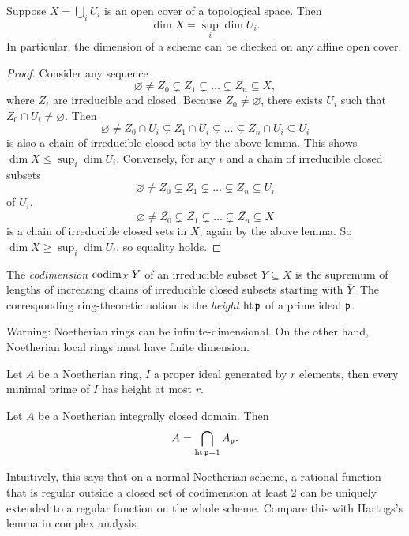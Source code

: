 \documentclass[11pt]{amsart}
\begin{document}
\begin{cor}
Suppose $X = \bigcup_i U_i$ is an open cover of a topological space. Then
    \[\dim X = \sup_i \dim U_i.\]
In particular, the dimension of a scheme can be checked on any affine open cover.
\end{cor}


\begin{proof}
    Consider any sequence
    \[\varnothing \neq Z_0 \subsetneq Z_1 \subsetneq \dots \subsetneq Z_n \subseteq X,\]
    where $Z_i$ are irreducible and closed. Because $Z_0\neq \varnothing$, there exists $U_i$ such that $Z_0\cap U_i\neq \varnothing$. Then
    \[\varnothing \neq Z_0\cap U_i \subsetneq Z_1\cap U_i \subsetneq \dots \subsetneq Z_n\cap U_i \subseteq U_i\]
    is also a chain of irreducible closed sets by the above lemma. This shows $\dim X \le \sup_i \dim U_i$. Conversely, for any $i$ and a chain of irreducible closed subsets
    \[\varnothing \neq Z_0 \subsetneq Z_1 \subsetneq \dots \subsetneq Z_n \subseteq U_i\]
    of $U_i$,
    \[\varnothing \neq \bar{Z_0} \subsetneq \bar{Z_1} \subsetneq \dots \subsetneq \bar{Z_n} \subseteq X\]
    is a chain of irreducible closed sets in $X$, again by the above lemma. So $\dim X \ge \sup_i \dim U_i$, so equality holds.
\end{proof}


\begin{defn}
    The \emph{codimension} $\operatorname{codim}_X Y$ of an irreducible subset $Y\subseteq X$ is the supremum of lengths of increasing chains of irreducible closed subsets starting with $\bar{Y}$. The corresponding ring-theoretic notion is the \emph{height} $\operatorname{ht} \mathfrak{p}$ of a prime ideal $\mathfrak{p}$.
\end{defn}

Warning: Noetherian rings can be infinite-dimensional. On the other hand, Noetherian local rings must have finite dimension. 

\begin{thm}
    Let $A$ be a Noetherian ring, $I$ a proper ideal generated by $r$ elements, then every minimal prime of $I$ has height at most $r$.
\end{thm}

\begin{thm}
\label{hartogs}
    Let $A$ be a Noetherian integrally closed domain. Then
    \[A = \bigcap_{\operatorname{ht} \mathfrak{p} = 1} A_{\mathfrak{p}}.\]
\end{thm}

Intuitively, this says that on a normal Noetherian scheme, a rational function that is regular outside a closed set of codimension at least 2 can be uniquely extended to a regular function on the whole scheme. Compare this with Hartogs's lemma in complex analysis.
\end{document}

